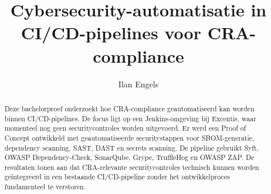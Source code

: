 \documentclass[a0,portrait]{hogent-poster}
\title{Cybersecurity-automatisatie in CI/CD-pipelines voor CRA-compliance}
\author{Ilan Engels}
\begin{document}
\maketitle

\begin{abstract}
  Deze bachelorproef onderzoekt hoe CRA-compliance geautomatiseerd kan worden binnen CI/CD-pipelines. De focus ligt op een Jenkins-omgeving bij Excentis, waar momenteel nog geen securitycontroles worden uitgevoerd. Er werd een Proof of Concept ontwikkeld met geautomatiseerde securitystappen voor SBOM-generatie, dependency scanning, SAST, DAST en secrets scanning. De pipeline gebruikt Syft, OWASP Dependency-Check, SonarQube, Grype, TruffleHog en OWASP ZAP. De resultaten tonen aan dat CRA-relevante securitycontroles technisch kunnen worden geïntegreerd in een bestaande CI/CD-pipeline zonder het ontwikkelproces fundamenteel te verstoren.
\end{abstract}
\end{document}
